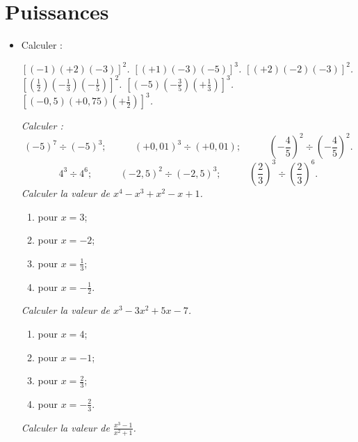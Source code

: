 \chapter{Puissances}

\begin{itemize}
\it Calculer les puissances d'exposant $2$, $3$, $4$, $5$ des nombres suivants : 
\[ (+1); \phantom{miou}(+3); \phantom{miou}(+5); \phantom{miou}(-2); \phantom{miou}(-4); \phantom{miou}(-5).\]
\it Calculer : \[ (-11)^3; \phantom{miou}(+9)^2; \phantom{miou}(-10)^5; \phantom{miou}(+7)^4; \phantom{miou}(-13)^4.\]
\it Calculer : \[ \left(-\frac12\right)^5; \phantom{miou}\left(+\frac23\right)^2; \phantom{miou}\left(-\frac34\right)^3; \phantom{miou}(+1,4)^2; \phantom{miou}(-0,25)^2.\]
\it Calculer : \[ 5^3\times 5^2; \phantom{miou}(-7)\times(-7)^2; \phantom{miou}\left(\frac23\right)\times \left(\frac23\right)^3; \phantom{miou}
\left[\left(-\frac14\right)^2\right]^2\left[(-2)^2\right]^3\]
\item Calculer : 
\begin{itemize}
\it $[(-1)(+2)(-3)]^2$.
\it $[(+1)(-3)(-5)]^3$.
\it $[(+2)(-2)(-3)]^2$.
\it $\displaystyle\left[\left(\frac12\right)\left(-\frac13\right)\left(-\frac15\right)\right]^2$.
\it $ \displaystyle\left[(-5)\left(-\frac35\right)
\left(+\frac13\right)\right]^3$.
\it $\displaystyle \left[ (-0,5)(+0,75)\left(+\frac12\right)\right]^3$.
\end{itemize}
\it Calculer : 
\[ (-5)^7\div (-5)^3; \phantom{miaou}
(+0,01)^3\div (+0,01); \phantom{miaou} 
\left(-\frac45\right)^2\div \left(-\frac45\right)^2.\]
\[ 4^3\div 4^6; \phantom{miaou} (-2,5)^2\div (-2,5)^3; 
\phantom{miaou} \left(\frac23\right)^3\div \left(\frac23\right)^6.\]
\it Calculer la valeur de $x^4-x^3+x^2-x+1$. 
\begin{enumerate}
\item pour $x=3$;
\item pour $x=-2$;
\item pour $x=\frac13$;
\item pour $x=-\frac12$.
\end{enumerate}
\it Calculer la valeur de $x^3-3x^2+5x-7$. 
\begin{enumerate}
\item pour $x=4$;
\item pour $x=-1$;
\item pour $x=\frac23$;
\item pour $x=-\frac23$.
\end{enumerate}
\it Calculer la valeur de $\displaystyle\frac{x^3-1}{x^2+1}$. 

\end{itemize}
